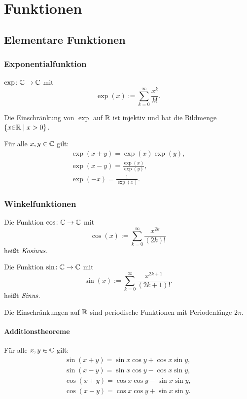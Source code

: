 
\chapter{Funktionen}
\section{Elementare Funktionen}
\subsection{Exponentialfunktion}
\begin{Definition}
$\exp\colon\mathbb C\to\mathbb C$ mit
\begin{equation}
\exp(x) := \sum_{k=0}^{\infty} \frac{x^k}{k!}.
\end{equation}
\end{Definition}
\noindent
Die Einschränkung von $\exp$ auf $\mathbb R$ ist injektiv und
hat die Bildmenge $\{x{\in}\mathbb R\mid x>0\}$.

Für alle $x,y\in\mathbb C$ gilt:
\begin{gather}
\exp(x+y) = \exp(x)\exp(y),\\
\exp(x-y) = \frac{\exp(x)}{\exp(y)},\\
\exp(-x) = \frac{1}{\exp(x)}.
\end{gather}

\subsection{Winkelfunktionen}
\begin{Definition} Die Funktion
$\cos\colon\mathbb C\to\mathbb C$ mit
\begin{equation}
\cos(x) := \sum_{k=0}^\infty \frac{x^{2k}}{(2k)!}
\end{equation}
heißt $\textit{Kosinus}$.

Die Funktion $\sin\colon\mathbb C\to\mathbb C$ mit
\begin{equation}
\sin(x) := \sum_{k=0}^\infty \frac{x^{2k+1}}{(2k+1)!}.
\end{equation}
heißt $\textit{Sinus}$.
\end{Definition}
Die Einschränkungen auf $\mathbb R$ sind periodische Funktionen mit
Periodenlänge $2\pi$.

\subsubsection{Additionstheoreme}

Für alle $x,y\in\mathbb C$ gilt:
\begin{gather}
\sin(x+y) = \sin x\cos y+\cos x\sin y,\\
\sin(x-y) = \sin x\cos y-\cos x\sin y,\\
\cos(x+y) = \cos x\cos y-\sin x\sin y,\\
\cos(x-y) = \cos x\cos y+\sin x\sin y.
\end{gather}

